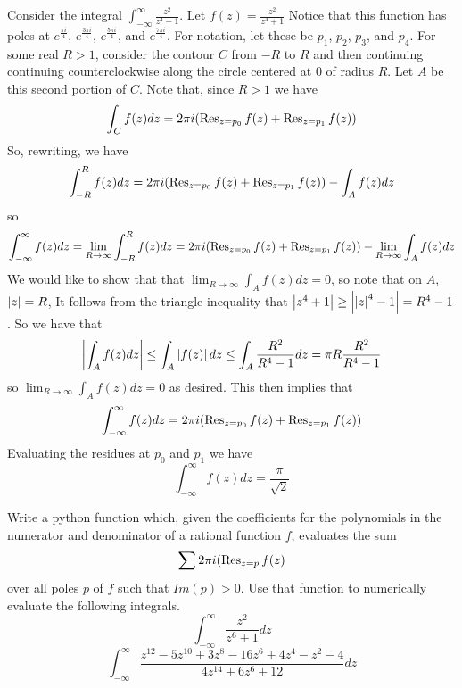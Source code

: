 Consider the integral $\int_{-\infty}^{\infty}\frac{z^2}{z^4+1}$. Let $f(z)=\frac{z^2}{z^4+1}$ Notice that this function has poles at $e^{\frac{\pi i}{4}}$, $e^{\frac{3\pi i}{4}}$, $e^{\frac{5\pi i}{4}}$, and $e^{\frac{7\pi i}{4}}$. For notation, let these be $p_1$, $p_2$, $p_3$, and $p_4$. For some real $R>1$, consider the contour $C$ from $-R$ to $R$ and then continuing continuing counterclockwise along the circle centered at $0$ of radius $R$. Let $A$ be this second portion of $C$. Note that, since $R>1$ we have
\begin{equation*}
\int_C f(z)dz = 2\pi i (\operatorname{Res}_{z=p_0} f(z) +\operatorname{Res}_{z=p_1} f(z))
\end{equation*}
So, rewriting, we have
\begin{equation*}
\int_{-R}^R f(z) dz = 2\pi i (\operatorname{Res}_{z=p_0} f(z) +\operatorname{Res}_{z=p_1} f(z)) - \int_A f(z) dz
\end{equation*}
so
\begin{equation*}
\int_{-\infty}^{\infty} f(z) dz = \lim_{R\to \infty} \int_{-R}^R f(z) dz = 2\pi i (\operatorname{Res}_{z=p_0} f(z) +\operatorname{Res}_{z=p_1} f(z)) - \lim_{R\to \infty} \int_A f(z) dz
\end{equation*}
We would like to show that that $\lim_{R\to\infty} \int_A f(z) dz = 0$, so note that on $A$, $\left\lvert z\right\rvert=R$, It follows from the triangle inequality that $\left\lvert z^4+1\right\rvert\geq \left\lvert\left\lvert z\right\rvert^4-1\right\rvert = R^4 -1$. So we have that 
$$\left\lvert\int_A f(z) dz\right\rvert\leq \int_A \left\lvert f(z)\right\rvert dz \leq \int_A \frac{R^2}{R^4 -1}dz = \pi R \frac{R^2}{R^4-1}$$
so $\lim_{R\to\infty} \int_A f(z) dz = 0$ as desired. This then implies that 
\begin{equation*}
 \int_{-\infty}^{\infty} f(z) dz = 2\pi i (\operatorname{Res}_{z=p_0} f(z) +\operatorname{Res}_{z=p_1} f(z))
\end{equation*}
Evaluating the residues at $p_0$ and $p_1$ we have
$$\int_{-\infty}^{\infty} f(z) dz = \frac{\pi}{\sqrt{2}}$$

\begin{problem}
Write a python function which, given the coefficients for the polynomials in the numerator and denominator of a rational function $f$, evaluates the sum
\begin{equation*}
\sum 2\pi i (\operatorname{Res}_{z=p} f(z)
\end{equation*}
over all poles $p$ of $f$ such that $Im(p)>0$.
Use that function to numerically evaluate the following integrals.
$$\int_{-\infty}^{\infty} \frac{z^2}{z^6+1}dz$$
$$\int_{-\infty}^{\infty} \frac{z^{12}-5z^{10}+3z^8-16z^6+4z^4-z^2-4}{4z^{14}+6z^6+12}dz$$
\end{problem}

